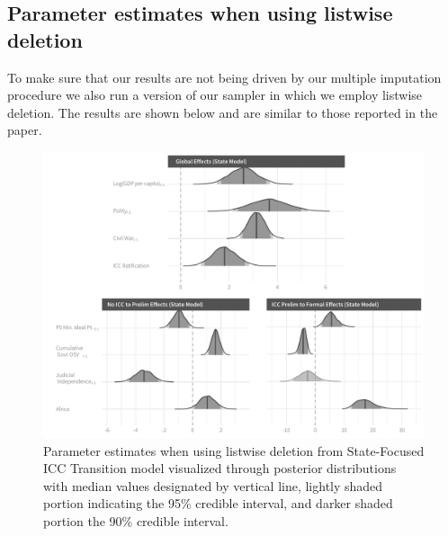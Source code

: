 \FloatBarrier
\clearpage
\subsection*{Parameter estimates when using listwise deletion}

To make sure that our results are not being driven by our multiple imputation procedure we also run a version of our sampler in which we employ listwise deletion. The results are shown below and are similar to those reported in the paper.


\begin{figure}
    \centering
    \includegraphics[width=1\textwidth]{stateCoefSumm_noImp.pdf}
    \caption{Parameter estimates when using listwise deletion from State-Focused ICC Transition model visualized through posterior distributions with median values designated by vertical line, lightly shaded portion indicating the 95\% credible interval, and darker shaded portion the 90\% credible interval.}
    \label{fig:stateModel_noImp}
\end{figure}


